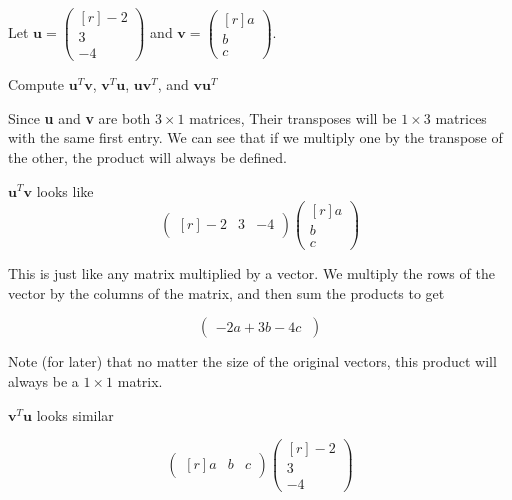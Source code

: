 \documentclass[11pt]{amsart}
\begin{document}
\begin{tcolorbox}[title=2.1.27 \hfill Isaac Baer , halign title=center] %
\begin{center}
Let $\textbf{u}=
\begin{pmatrix*}[r]
-2\\
3\\
-4
\end{pmatrix*}$
and $\textbf{v}=
\begin{pmatrix*}[r]
a\\
b\\
c
\end{pmatrix*}
$.
\end{center} 

\vspace{10mm}

Compute $\textbf{u}^T\textbf{v}$, $\textbf{v}^T\textbf{u}$, $\textbf{uv}^T$, and $\textbf{vu}^T$
\end{tcolorbox}

Since \textbf{u} and \textbf{v} are both $3\times1$ matrices, Their transposes will be $1\times3$ matrices with the same first entry. We can see that if we multiply one by the transpose of the other, the product will always be defined.

$\textbf{u}^T\textbf{v}$ looks like 
\[
\begin{pmatrix*}[r]
-2&3&-4
\end{pmatrix*}
\begin{pmatrix*}[r]
a\\
b\\
c
\end{pmatrix*}
\]

This is just like any matrix multiplied by a vector. We multiply the rows of the vector by the columns of the matrix, and then sum the products to get

\[
\begin{pmatrix}
-2a+3b-4c\
\end{pmatrix}
\]

Note (for later) that no matter the size of the original vectors, this product will always be a $1\times1$ matrix.

$\textbf{v}^T\textbf{u}$ looks similar

\[
\begin{pmatrix*}[r]
a&b&c
\end{pmatrix*}
\begin{pmatrix*}[r]
-2\\
3\\
-4
\end{pmatrix*}
\]
\end{document}
